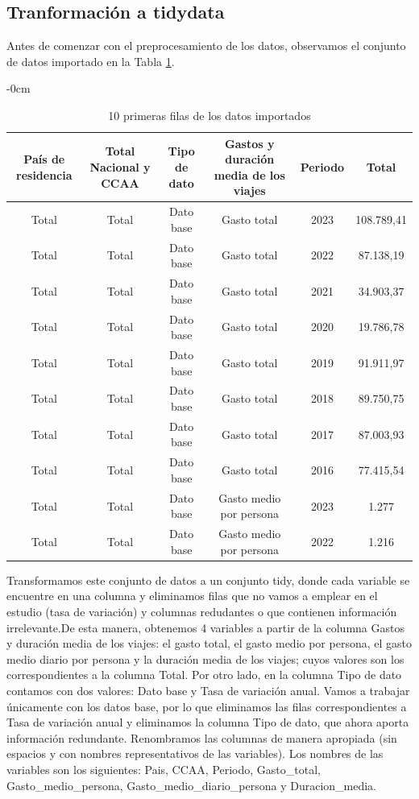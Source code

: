 \documentclass[data,article,submit,moreauthors,pdftex]{Definitions/mdpi}
\begin{document}
\hypertarget{tranformaciuxf3n-a-tidydata}{%
\subsection{Tranformación a
tidydata}\label{tranformaciuxf3n-a-tidydata}}

Antes de comenzar con el preprocesamiento de los datos, observamos el
conjunto de datos importado en la Tabla \ref{tab:unnamed-chunk-4}.

\begin{table}[H]

\caption{\label{tab:unnamed-chunk-4}10 primeras filas de los datos importados}
\begin{adjustwidth}{-\extralength}{0cm}
             \small
\begin{tabular}[t]{cccccc}
\toprule
País de residencia & Total Nacional y CCAA & Tipo de dato & Gastos y duración media de los viajes & Periodo & Total\\
\midrule
Total & Total & Dato base & Gasto total & 2023 & 108.789,41\\
Total & Total & Dato base & Gasto total & 2022 & 87.138,19\\
Total & Total & Dato base & Gasto total & 2021 & 34.903,37\\
Total & Total & Dato base & Gasto total & 2020 & 19.786,78\\
Total & Total & Dato base & Gasto total & 2019 & 91.911,97\\
Total & Total & Dato base & Gasto total & 2018 & 89.750,75\\
Total & Total & Dato base & Gasto total & 2017 & 87.003,93\\
Total & Total & Dato base & Gasto total & 2016 & 77.415,54\\
Total & Total & Dato base & Gasto medio por persona & 2023 & 1.277\\
Total & Total & Dato base & Gasto medio por persona & 2022 & 1.216\\
\bottomrule
\end{tabular}
    \end{adjustwidth}
\end{table}

Transformamos este conjunto de datos a un conjunto tidy, donde cada
variable se encuentre en una columna y eliminamos filas que no vamos a
emplear en el estudio (tasa de variación) y columnas redudantes o que
contienen información irrelevante.De esta manera, obtenemos 4 variables
a partir de la columna Gastos y duración media de los viajes: el gasto
total, el gasto medio por persona, el gasto medio diario por persona y
la duración media de los viajes; cuyos valores son los correspondientes
a la columna Total. Por otro lado, en la columna Tipo de dato contamos
con dos valores: Dato base y Tasa de variación anual. Vamos a trabajar
únicamente con los datos base, por lo que eliminamos las filas
correspondientes a Tasa de variación anual y eliminamos la columna Tipo
de dato, que ahora aporta información redundante. Renombramos las
columnas de manera apropiada (sin espacios y con nombres representativos
de las variables). Los nombres de las variables son los siguientes:
Pais, CCAA, Periodo, Gasto\_total, Gasto\_medio\_persona,
Gasto\_medio\_diario\_persona y Duracion\_media.
\end{document}
